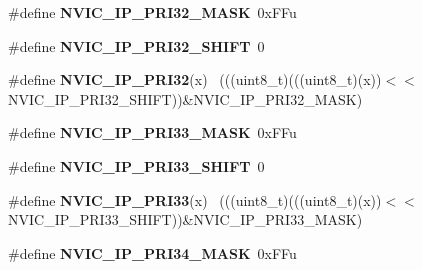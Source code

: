 \begin{DoxyCompactItemize}
\item 
\hypertarget{group___n_v_i_c___register___masks_gad6b0ca9385217e755883eed60eb85a67}{}\#define {\bfseries N\+V\+I\+C\+\_\+\+I\+P\+\_\+\+P\+R\+I32\+\_\+\+M\+A\+S\+K}~0x\+F\+Fu\label{group___n_v_i_c___register___masks_gad6b0ca9385217e755883eed60eb85a67}

\item 
\hypertarget{group___n_v_i_c___register___masks_ga650ae8199393e8b0242ec909e1ef9c95}{}\#define {\bfseries N\+V\+I\+C\+\_\+\+I\+P\+\_\+\+P\+R\+I32\+\_\+\+S\+H\+I\+F\+T}~0\label{group___n_v_i_c___register___masks_ga650ae8199393e8b0242ec909e1ef9c95}

\item 
\hypertarget{group___n_v_i_c___register___masks_ga9c9ca6ce0cbf7f1cc5fcaf05a29bf08a}{}\#define {\bfseries N\+V\+I\+C\+\_\+\+I\+P\+\_\+\+P\+R\+I32}(x)                                              ~(((uint8\+\_\+t)(((uint8\+\_\+t)(x))$<$$<$N\+V\+I\+C\+\_\+\+I\+P\+\_\+\+P\+R\+I32\+\_\+\+S\+H\+I\+F\+T))\&N\+V\+I\+C\+\_\+\+I\+P\+\_\+\+P\+R\+I32\+\_\+\+M\+A\+S\+K)\label{group___n_v_i_c___register___masks_ga9c9ca6ce0cbf7f1cc5fcaf05a29bf08a}

\item 
\hypertarget{group___n_v_i_c___register___masks_gae08526d79e3dd64a99d619b615af4140}{}\#define {\bfseries N\+V\+I\+C\+\_\+\+I\+P\+\_\+\+P\+R\+I33\+\_\+\+M\+A\+S\+K}~0x\+F\+Fu\label{group___n_v_i_c___register___masks_gae08526d79e3dd64a99d619b615af4140}

\item 
\hypertarget{group___n_v_i_c___register___masks_gaa43389facdcdb5d51175c9dfffa831d0}{}\#define {\bfseries N\+V\+I\+C\+\_\+\+I\+P\+\_\+\+P\+R\+I33\+\_\+\+S\+H\+I\+F\+T}~0\label{group___n_v_i_c___register___masks_gaa43389facdcdb5d51175c9dfffa831d0}

\item 
\hypertarget{group___n_v_i_c___register___masks_ga48f6935bd9a97f012e0f182d78072ecc}{}\#define {\bfseries N\+V\+I\+C\+\_\+\+I\+P\+\_\+\+P\+R\+I33}(x)                                              ~(((uint8\+\_\+t)(((uint8\+\_\+t)(x))$<$$<$N\+V\+I\+C\+\_\+\+I\+P\+\_\+\+P\+R\+I33\+\_\+\+S\+H\+I\+F\+T))\&N\+V\+I\+C\+\_\+\+I\+P\+\_\+\+P\+R\+I33\+\_\+\+M\+A\+S\+K)\label{group___n_v_i_c___register___masks_ga48f6935bd9a97f012e0f182d78072ecc}

\item 
\hypertarget{group___n_v_i_c___register___masks_ga6f782b2b415e3c27935830ee42dcb8f6}{}\#define {\bfseries N\+V\+I\+C\+\_\+\+I\+P\+\_\+\+P\+R\+I34\+\_\+\+M\+A\+S\+K}~0x\+F\+Fu\label{group___n_v_i_c___register___masks_ga6f782b2b415e3c27935830ee42dcb8f6}


\end{DoxyCompactItemize}

